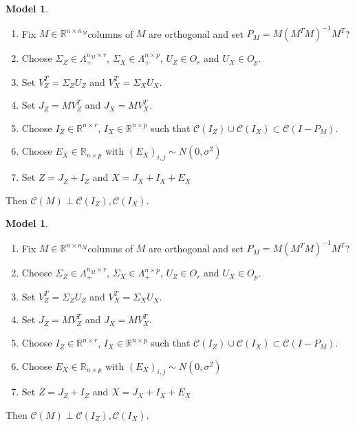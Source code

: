 \documentclass[notheorems]{beamer}
\theoremstyle{definition}
\newtheorem{modl}[model]{Model}
\newcommand{\Lam}{\Lambda}
\newcommand{\Sig}{\Sigma}
\newcommand{\sig}{\sigma}
\newcommand{\R}{\mathbb{R}}
\newcommand{\MC}{\mathcal{C}}
\begin{document}
\begin{frame}
\begin{modl}\
\begin{enumerate}
    \item Fix $M \in \R^{n \times n_M}$columns of $M$ are orthogonal and set $P_M = M(M^TM)^{-1}M^T $?
    \item Choose $\Sig_Z \in \Lam^{n_M \times r}_+$, $\Sig_X \in \Lam^{n \times p}_+$,  $U_Z \in O_{r}$ and $U_X \in O_p$. 
    \item Set $V_Z^T = \Sig_Z U_Z$ and $V_X^T = \Sig_X U_X$. 
    \item Set $J_Z = MV_Z^T$ and $J_X = MV_X^T$. 
    \item Choose $I_Z \in \R^{n \times r}$, $I_X \in \R^{n \times p}$ such that $\MC(I_Z) \cup \MC(I_X) \subset \MC(I -P_M)$. 
    \item Choose $E_X \in \R_{n \times p}$ with $(E_X)_{i,j} \sim N(0, \sig^2)$
    \item Set $Z = J_Z + I_Z$ and $X = J_X + I_X + E_X$ 
\end{enumerate}
Then $\MC(M) \perp \MC(I_Z), \MC(I_X)$.
\end{modl}
\end{frame}

















\begin{frame}
\begin{modl}\
\begin{enumerate}
    \item Fix $M \in \R^{n \times n_M}$columns of $M$ are orthogonal and set $P_M = M(M^TM)^{-1}M^T $?
    \item Choose $\Sig_Z \in \Lam^{n_M \times r}_+$, $\Sig_X \in \Lam^{n \times p}_+$,  $U_Z \in O_{r}$ and $U_X \in O_p$. 
    \item Set $V_Z^T = \Sig_Z U_Z$ and $V_X^T = \Sig_X U_X$. 
    \item Set $J_Z = MV_Z^T$ and $J_X = MV_X^T$. 
    \item Choose $I_Z \in \R^{n \times r}$, $I_X \in \R^{n \times p}$ such that $\MC(I_Z) \cup \MC(I_X) \subset \MC(I -P_M)$. 
    \item Choose $E_X \in \R_{n \times p}$ with $(E_X)_{i,j} \sim N(0, \sig^2)$
    \item Set $Z = J_Z + I_Z$ and $X = J_X + I_X + E_X$ 
\end{enumerate}
Then $\MC(M) \perp \MC(I_Z), \MC(I_X)$.
\end{modl}
\end{frame}
\end{document}
